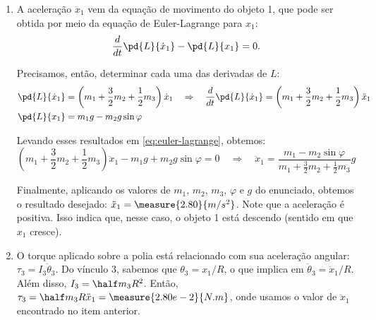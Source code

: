\begin{question}
\begin{solution}
\begin{enumerate}
			\item A aceleração $\ddot x_1$ vem da equação de movimento do objeto 1, que pode ser obtida por meio da equação de Euler-Lagrange para $x_1$:
			\begin{equation}\label{eq:euler-lagrange}
				\frac{d}{dt}\pd{L}{\dot x_1} - \pd{L}{x_1} = 0.
			\end{equation}

			Precisamos, então, determinar cada uma das derivadas de $L$:
			\begin{align*}
				\pd{L}{\dot x_1} &= \left(m_1 + \frac{3}{2}m_2 + \frac{1}{2}m_3\right)\dot x_1 \quad\Rightarrow\quad
					\frac{d}{dt}\pd{L}{\dot x_1} = \left(m_1 + \frac{3}{2}m_2 + \frac{1}{2}m_3\right)\ddot x_1 \\
				\pd{L}{x_1} &= m_1g - m_2g\sin\varphi
			\end{align*}

			Levando esses resultados em \eqref{eq:euler-lagrange}, obtemos:
			\begin{equation*}
				\left(m_1 + \frac{3}{2}m_2 + \frac{1}{2}m_3\right)\ddot x_1 - m_1 g + m_2 g \sin \varphi = 0
				\quad\Rightarrow\quad
				\ddot x_1 = \frac{m_1 - m_2 \sin \varphi}{m_1 + \frac{3}{2}m_2 + \frac{1}{2}m_3}g
			\end{equation*}

			Finalmente, aplicando os valores de $m_1$, $m_2$, $m_3$, $\varphi$ e $g$ do enunciado, obtemos o resultado desejado: $\ddot x_1 = \measure{2.80}{m/s^2}$.
			Note que a aceleração é positiva.
			Isso indica que, nesse caso, o objeto 1 está descendo (sentido em que $x_1$ cresce).

			\item O torque aplicado sobre a polia está relacionado com sua aceleração angular: $\tau_3 = I_3 \ddot\theta_3$.
			Do vínculo 3, sabemos que $\theta_3 = x_1/R$, o que implica em $\ddot\theta_3 = \ddot x_1/R$.
			Além disso, $I_3 = \half m_3 R^2$.
			Então, $\tau_3 = \half m_3 R \ddot x_1 = \measure{2.80e-2}{N.m}$, onde usamos o valor de $\ddot x_1$ encontrado no item anterior.
		\end{enumerate}
	\end{solution}
\end{question}